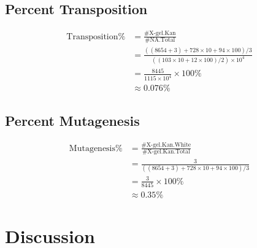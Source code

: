 \documentclass{article}
\begin{document}
		\subsection{Percent Transposition}
			$$
			\begin{aligned}
			\text{Transposition}\% &= \frac{\#\text{X-gel.Kan}}{\#\text{NA.Total}}\\
			&= \frac{((8654 + 3) + 728 \times 10 + 94 \times 100) / 3}{((103 \times 10 + 12 \times 100) / 2) \times 10 ^4}\\
			&= \frac{8445}{1115 \times 10 ^4} \times 100\%\\
			&\approx 0.076\%
			\end{aligned}
			$$
		\subsection{Percent Mutagenesis}
			$$
			\begin{aligned}
			\text{Mutagenesis}\% &= \frac{\#\text{X-gel.Kan.White}}{\#\text{X-gel.Kan.Total}}\\
			&= \frac{3}{((8654 + 3) + 728 \times 10 + 94 \times 100) / 3}\\
			&= \frac{3}{8445} \times 100\%\\
			&\approx 0.35\%
			\end{aligned}
			$$
	\section{Discussion}
\end{document}
